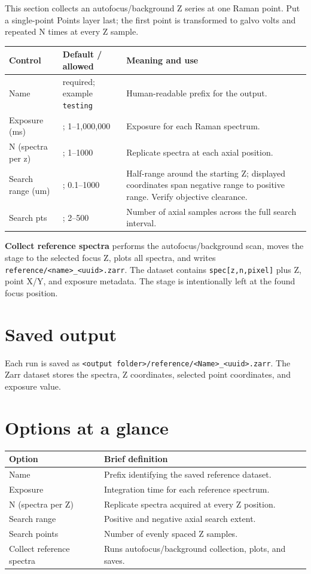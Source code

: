 \documentclass[11pt,oneside]{report}
\makeatletter
\newcommand{\ui}[1]{\textbf{#1}}
\newcommand{\code}[1]{\texttt{#1}}
\newcommand{\fieldtable}{\begin{longtable}{@{}>{\raggedright\arraybackslash}p{0.25\textwidth}>{\raggedright\arraybackslash}p{0.18\textwidth}>{\raggedright\arraybackslash}p{0.50\textwidth}@{}}\toprule\textbf{Control} & \textbf{Default / allowed} & \textbf{Meaning and use}\\\midrule\endhead}
\newcommand{\finishfieldtable}{\bottomrule\end{longtable}}
\makeatother
\begin{document}
This section collects an autofocus/background Z series at one Raman point. Put a
single-point Points layer last; the first point is transformed to galvo volts and
repeated N times at every Z sample.

\fieldtable
Name & required; example \code{testing} & Human-readable prefix for the output.\\
Exposure (ms) & 1000; 1--1,000,000 & Exposure for each Raman spectrum.\\
N (spectra per z) & 5; 1--1000 & Replicate spectra at each axial position.\\
Search range (um) & 10; 0.1--1000 & Half-range around the starting Z; displayed
coordinates span negative range to positive range. Verify objective clearance.\\
Search pts & 20; 2--500 & Number of axial samples across the full search interval.\\
\finishfieldtable

\ui{Collect reference spectra} performs the autofocus/background scan, moves the
stage to the selected focus Z, plots all spectra, and writes
\code{reference/<name>\_<uuid>.zarr}. The dataset contains \code{spec[z,n,pixel]}
plus Z, point X/Y, and exposure metadata. The stage is intentionally left at the
found focus position.

\section*{Saved output}
Each run is saved as
\code{<output folder>/reference/<Name>\_<uuid>.zarr}. The Zarr dataset stores the
spectra, Z coordinates, selected point coordinates, and exposure value.

\section*{Options at a glance}
\begin{longtable}{@{}p{}p{}@{}}
\toprule\textbf{Option} & \textbf{Brief definition}\\\midrule
Name & Prefix identifying the saved reference dataset.\\
Exposure & Integration time for each reference spectrum.\\
N (spectra per Z) & Replicate spectra acquired at every Z position.\\
Search range & Positive and negative axial search extent.\\
Search points & Number of evenly spaced Z samples.\\
Collect reference spectra & Runs autofocus/background collection, plots, and saves.\\
\bottomrule\end{longtable}
\end{document}

